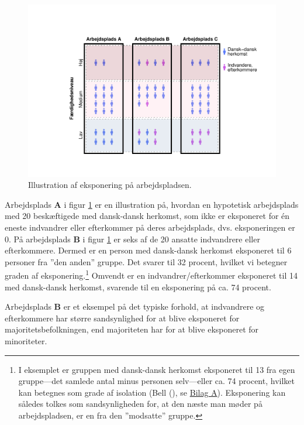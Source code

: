 \documentclass[
]{book}
\begin{document}
\begin{figure}
\includegraphics[width=1\linewidth]{en-befolkning-blander-sig_files/figure-latex/fig-5-1-1} \caption{Illustration af eksponering på arbejdspladsen.}\label{fig:fig-5-1}
\end{figure}

Arbejdsplads \textbf{A} i figur \ref{fig:fig-5-1} er en illustration på, hvordan en hypotetisk arbejdsplads med 20 beskæftigede med dansk-dansk herkomst, som ikke er eksponeret for én eneste indvandrer eller efterkommer på deres arbejdsplads, dvs. eksponeringen er \(0\). På arbejdsplads \textbf{B} i figur \ref{fig:fig-5-1} er seks af de 20 ansatte indvandrere eller efterkommere. Dermed er en person med dansk-dansk herkomst eksponeret til 6 personer fra ''den anden'' gruppe. Det svarer til 32 procent, hvilket vi betegner graden af eksponering.\footnote{I eksemplet er gruppen med dansk-dansk herkomst eksponeret til 13 fra egen gruppe---det samlede antal minus personen selv---eller ca. 74 procent, hvilket kan betegnes som grade af isolation (Bell (), se \hyperref[bilagA]{Bilag A}). Eksponering kan således tolkes som sandsynligheden for, at den næste man møder på arbejdspladsen, er en fra den ''modsatte'' gruppe.} Omvendt er en indvandrer/efterkommer eksponeret til 14 med dansk-dansk herkomst, svarende til en eksponering på ca. 74 procent.

Arbejdsplads \textbf{B} er et eksempel på det typiske forhold, at indvandrere og efterkommere har større sandsynlighed for at blive eksponeret for majoritetsbefolkningen, end majoriteten har for at blive eksponeret for minoriteter.
\end{document}
